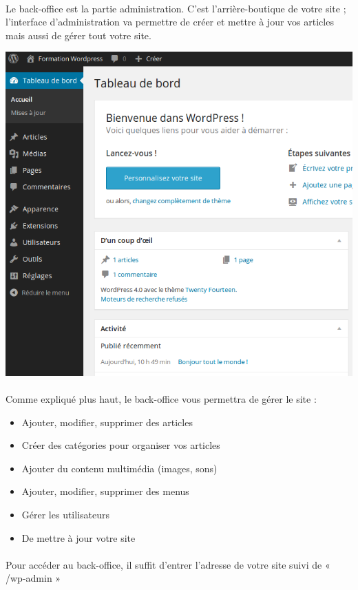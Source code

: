 \documentclass[10pt,a4paper]{article}
\begin{document}
\paragraph{}Le back-office est la partie administration. C'est l’arrière-boutique de votre site ; l'interface d’administration va permettre de créer et mettre à jour vos articles mais aussi de gérer tout votre site.
\begin{center}
\includegraphics[scale=0.5]{img/0046.png}
\end{center}
\paragraph{}Comme expliqué plus haut, le back-office vous permettra de gérer le site :
\begin{itemize}
\item Ajouter, modifier, supprimer des articles
\item Créer des catégories pour organiser vos articles
\item Ajouter du contenu multimédia (images, sons)
\item Ajouter, modifier, supprimer des menus
\item Gérer les utilisateurs
\item De mettre à jour votre site
\end{itemize}
\paragraph{}Pour accéder au back-office, il suffit d'entrer l'adresse de votre site suivi de « /wp-admin »
\end{document}

